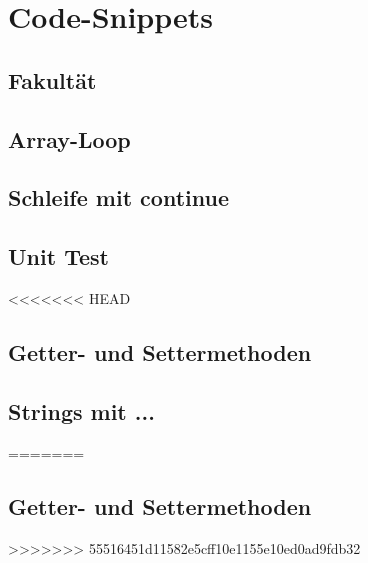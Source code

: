 \section{Code-Snippets}

\subsection{Fakultät}
    

\subsection{Array-Loop}{\label{Array-Loop}}
    

\subsection{Schleife mit continue}

\subsection{Unit Test}{\label{Unit-Test}}
<<<<<<< HEAD

\subsection{Getter- und Settermethoden}{\label{GetSet}}

\subsection{Strings mit ...}

=======

\subsection{Getter- und Settermethoden}{\label{GetSet}}
>>>>>>> 55516451d11582e5cff10e1155e10ed0ad9fdb32
